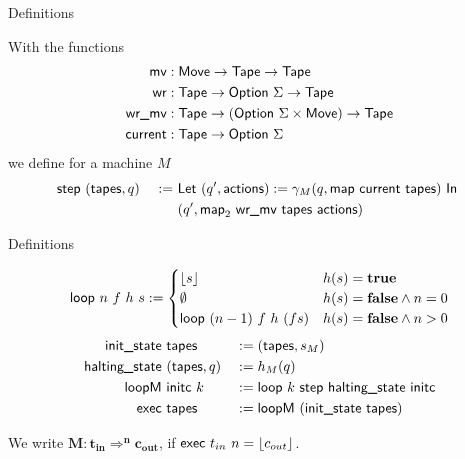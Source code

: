 \begin{frame}{Definitions}
  \begin{definition}
    With the functions
    \begin{alignat*}{2}
      \textsf{mv}      & : \textsf{Move} \rightarrow \textsf{Tape} \rightarrow \textsf{Tape} \\
      \textsf{wr}      & : \textsf{Tape} \rightarrow \textsf{Option}~\Sigma \rightarrow \textsf{Tape} \\
      \textsf{wr\_mv}  & : \textsf{Tape} \rightarrow (\textsf{Option}~\Sigma \times \textsf{Move}) \rightarrow \textsf{Tape} \\
      \textsf{current} & : \textsf{Tape} \rightarrow \textsf{Option}~\Sigma
    \end{alignat*}
    we define for a machine $M$
    \begin{alignat*}{2}
      \textsf{step}&~(\textsf{tapes}, q) &~:=~& \textsf{Let}~(q', \textsf{actions}) := \gamma_M(q, \textsf{map}~\textsf{current}~\textsf{tapes})~\textsf{In}~ \\
               &                 &~  ~& (q', \textsf{map}_2~\textsf{wr\_mv}~\textsf{tapes}~\textsf{actions})
      \end{alignat*}
  \end{definition}
\end{frame}

\begin{frame}{Definitions}
  \begin{definition}[Execution]
    \begin{align*}
      \textsf{loop}~n~f~h~s :=
      \begin{cases}
        \left\lfloor {s}\right\rfloor              & h(s) = \mathbf{true} \\
        \emptyset                 & h(s) = \mathbf{false} \land n = 0 \\
        \textsf{loop}~(n-1)~f~h~(f s)  & h(s) = \mathbf{false} \land n > 0
      \end{cases}
    \end{align*}
    \pause
    \begin{alignat*}{3}
      \textsf{init\_state}   &~\textsf{tapes}      &&:= (\textsf{tapes}, s_M) \\
      \textsf{halting\_state}&~(\textsf{tapes}, q) &&:= h_M(q) \\
      \textsf{loopM}         &~\textsf{initc}~k    &&:= \textsf{loop}~k~\textsf{step}~\textsf{halting\_state}~\textsf{initc} \\
      \textsf{exec}          &~\textsf{tapes}      &&:= \textsf{loopM}~(\textsf{init\_state}~\textsf{tapes})
    \end{alignat*}
  \end{definition}

  \pause
  We write $\mathbf{M:t_{in} \Rightarrow^n c_{out}}$, if $\textsf{exec}~t_{in}~n= \left\lfloor {c_{out}}\right\rfloor$.
\end{frame}


